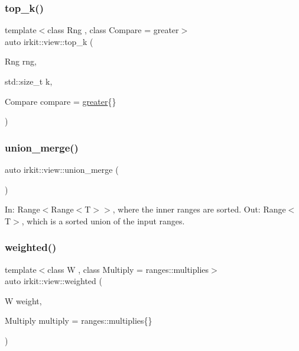 \subsubsection{\texorpdfstring{top\+\_\+k()}{top\_k()}\hspace{0.1cm}{\footnotesize\ttfamily [2/2]}}
{\footnotesize\ttfamily template$<$class Rng , class Compare  = greater$>$ \\
auto irkit\+::view\+::top\+\_\+k (\begin{DoxyParamCaption}\item[{Rng}]{rng,  }\item[{std\+::size\+\_\+t}]{k,  }\item[{Compare}]{compare = {\ttfamily \hyperlink{structirkit_1_1view_1_1greater}{greater}\{\}} }\end{DoxyParamCaption})}

\mbox{\label{namespaceirkit_1_1view_a45d94ed2030b7535ce266735e3dd49a3}} 
\subsubsection{\texorpdfstring{union\+\_\+merge()}{union\_merge()}}
{\footnotesize\ttfamily auto irkit\+::view\+::union\+\_\+merge (\begin{DoxyParamCaption}{ }\end{DoxyParamCaption})}

In\+: Range$<$Range$<$\+T$>$$>$, where the inner ranges are sorted. Out\+: Range$<$\+T$>$, which is a sorted union of the input ranges. \mbox{\label{namespaceirkit_1_1view_ab3c27d862e946a966c4d7f004407499a}} 
\subsubsection{\texorpdfstring{weighted()}{weighted()}}
{\footnotesize\ttfamily template$<$class W , class Multiply  = ranges\+::multiplies$>$ \\
auto irkit\+::view\+::weighted (\begin{DoxyParamCaption}\item[{W}]{weight,  }\item[{Multiply}]{multiply = {\ttfamily ranges\+:\+:multiplies\{\}} }\end{DoxyParamCaption})}

